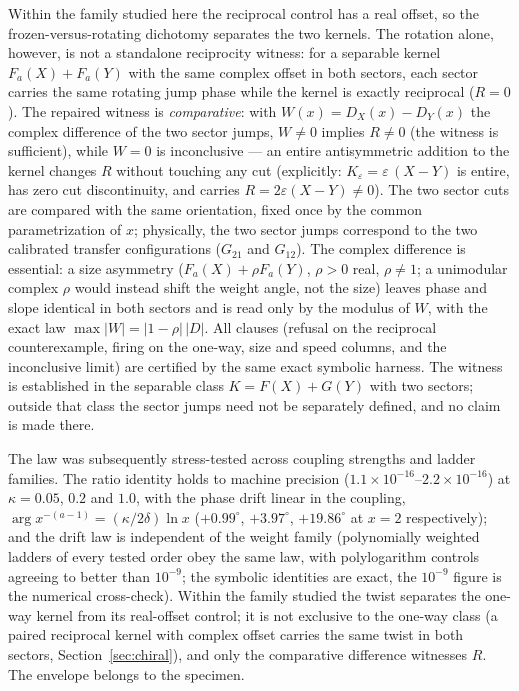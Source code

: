 \documentclass[11pt,a4paper]{article}
\begin{document}
Within the family studied here the reciprocal control has a real offset, so
the frozen-versus-rotating dichotomy separates the two kernels. The rotation
alone, however, is not a standalone reciprocity witness: for a separable
kernel $F_a(X) + F_a(Y)$ with the same complex offset in both sectors, each
sector carries the same rotating jump phase while the kernel is exactly
reciprocal ($R = 0$). The repaired witness is \emph{comparative}: with
$W(x) = D_X(x) - D_Y(x)$ the complex difference of the two sector jumps,
$W \neq 0$ implies $R \neq 0$ (the witness is sufficient), while $W = 0$ is
inconclusive --- an entire antisymmetric addition to the kernel changes $R$
without touching any cut (explicitly: $K_{\varepsilon} = \varepsilon\,(X -
Y)$ is entire, has zero cut discontinuity, and carries
$R = 2\varepsilon (X - Y) \neq 0$). The two sector cuts are compared with
the same orientation, fixed once by the common parametrization of $x$;
physically, the two sector jumps correspond to the two calibrated transfer
configurations ($G_{21}$ and $G_{12}$). The complex difference is essential: a size
asymmetry ($F_a(X) + \rho F_a(Y)$, $\rho > 0$ real, $\rho \neq 1$; a
unimodular complex $\rho$ would instead shift the weight angle, not the
size) leaves phase and slope identical in both sectors and is read only by
the modulus of $W$, with the
exact law $\max|W| = |1-\rho|\,|D|$. All clauses (refusal on the reciprocal
counterexample, firing on the one-way, size and speed columns, and the
inconclusive limit) are certified by the same exact symbolic harness. The
witness is established in the separable class $K = F(X) + G(Y)$ with two
sectors; outside that class the sector jumps need not be separately defined,
and no claim is made there.

The law was subsequently stress-tested across coupling strengths and
ladder families. The ratio identity holds to machine precision
($1.1\times10^{-16}$--$2.2\times10^{-16}$) at $\kappa = 0.05$, $0.2$ and
$1.0$, with the phase drift linear in the coupling,
$\arg x^{-(a-1)} = (\kappa/2\delta)\ln x$
($+0.99^\circ$, $+3.97^\circ$, $+19.86^\circ$ at $x = 2$ respectively);
and the drift law is independent of the weight family (polynomially
weighted ladders of every tested order obey the same law, with
polylogarithm controls agreeing to better than $10^{-9}$; the symbolic
identities are exact, the $10^{-9}$ figure is the numerical cross-check).
Within the family studied the twist separates the one-way kernel from its
real-offset control; it is not exclusive to the one-way class (a paired
reciprocal kernel with complex offset carries the same twist in both
sectors, Section~\ref{sec:chiral}), and only the comparative difference
witnesses $R$. The envelope belongs to the specimen.
\end{document}
